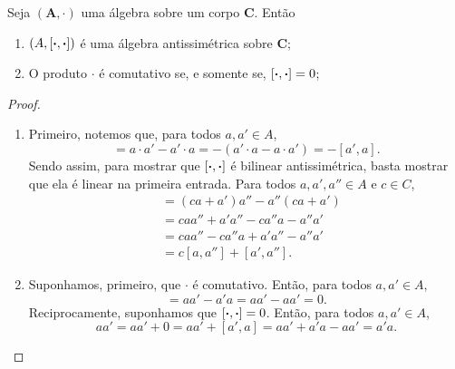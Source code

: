 \begin{prop}
Seja $(\bm A,\cdot)$ uma álgebra sobre um corpo $\bm C$. Então
	\begin{enumerate}
	\item $(A,[\bm{\cdot},\bm{\cdot}])$ é uma álgebra antissimétrica sobre $\bm C$;
	\item O produto $\cdot$ é comutativo se, e somente se, $[\bm{\cdot},\bm{\cdot}] = 0$;
	\end{enumerate}
\end{prop}
\begin{proof}
	\begin{enumerate}
	\item Primeiro, notemos que, para todos $a,a' \in A$,
		\begin{equation*}
		[a,a'] = a \cdot a' - a' \cdot a = -(a' \cdot a - a \cdot a') = -[a',a].
		\end{equation*}	
Sendo assim, para mostrar que $[\bm{\cdot},\bm{\cdot}]$ é bilinear antissimétrica, basta mostrar que ela é linear na primeira entrada. Para todos $a,a',a'' \in A$ e $c \in C$,
		\begin{align*}
		[ca+a',a''] &= (ca+a')a'' - a''(ca+a') \\
			&= caa'' + a'a'' - ca''a - a''a' \\
			&= caa'' - ca''a + a'a'' - a''a' \\
			&= c[a,a''] + [a',a''].
		\end{align*}

	\item Suponhamos, primeiro, que $\cdot$ é comutativo. Então, para todos $a,a' \in A$,
		\begin{equation*}
		[a,a'] = aa' - a'a = aa' - aa' = 0.
		\end{equation*}
Reciprocamente, suponhamos que $[\bm{\cdot},\bm{\cdot}]=0$. Então, para todos $a,a' \in A$,
		\begin{equation*}
		aa' = aa' + 0 = aa' + [a',a] = aa' + a'a - aa' = a'a.
		\end{equation*}


\end{enumerate}
\end{proof}
